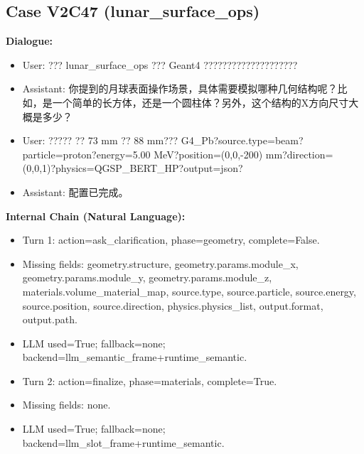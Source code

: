 \documentclass[11pt]{ctexart}
\begin{document}
\subsection{Case V2C47 (lunar\_surface\_ops)}
\textbf{Dialogue:}
\begin{itemize}
\item User: ??? lunar\_surface\_ops ??? Geant4 ????????????????????
\item Assistant: 你提到的月球表面操作场景，具体需要模拟哪种几何结构呢？比如，是一个简单的长方体，还是一个圆柱体？另外，这个结构的X方向尺寸大概是多少？
\item User: ????? ?? 73 mm ?? 88 mm??? G4\_Pb?source.type=beam?particle=proton?energy=5.00 MeV?position=(0,0,-200) mm?direction=(0,0,1)?physics=QGSP\_BERT\_HP?output=json?
\item Assistant: 配置已完成。
\end{itemize}
\textbf{Internal Chain (Natural Language):}
\begin{itemize}
\item Turn 1: action=ask\_clarification, phase=geometry, complete=False.
\item Missing fields: geometry.structure, geometry.params.module\_x, geometry.params.module\_y, geometry.params.module\_z, materials.volume\_material\_map, source.type, source.particle, source.energy, source.position, source.direction, physics.physics\_list, output.format, output.path.
\item LLM used=True; fallback=none; backend=llm\_semantic\_frame+runtime\_semantic.
\item Turn 2: action=finalize, phase=materials, complete=True.
\item Missing fields: none.
\item LLM used=True; fallback=none; backend=llm\_slot\_frame+runtime\_semantic.
\end{itemize}
\end{document}

